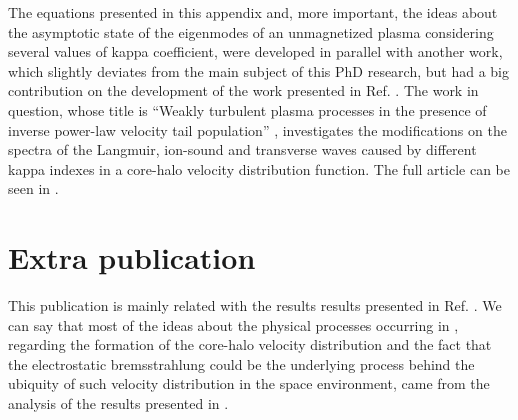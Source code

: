 \documentclass[12pt,a4paper,ruledheader]{report}
\begin{document}
\begin{appendix}
The equations presented in this appendix and, more important, the
ideas about the asymptotic state of the eigenmodes of an unmagnetized
plasma considering several values of kappa coefficient, were developed
in parallel with another work, which slightly deviates from the
main subject of this PhD research, but had a big contribution on the
development of the work presented in Ref. \cite{Tigik2017a}. 
The work in question, whose title
is ``Weakly turbulent plasma processes in the presence of inverse
power-law velocity tail population'' \cite{Tigik2017b}, investigates
the modifications on the spectra of the Langmuir, ion-sound and
transverse waves caused by different kappa indexes in a core-halo
velocity distribution function. The full article can be seen in
.


\chapter{Extra publication}
\label{appC}
This publication is mainly related with the results results presented in
Ref. \cite{Tigik2017a}.
We can say that most of the ideas about the physical processes occurring
in \cite{Tigik2017a}, regarding the formation of the core-halo velocity
distribution and the fact that the electrostatic bremsstrahlung could be
the underlying process behind the ubiquity of such velocity distribution
in the space environment, came from the analysis of the results presented
in \cite{Tigik2017b}. 



\end{appendix}




\end{document}
